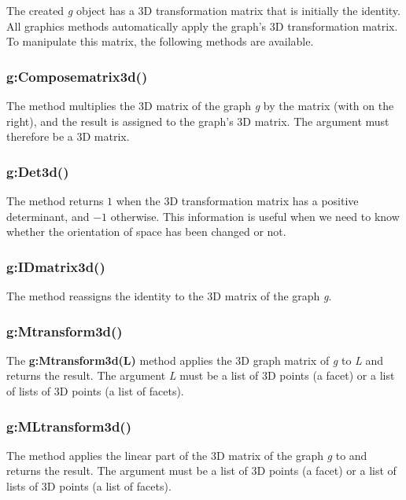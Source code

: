 The created \emph{g} object has a 3D transformation matrix that is initially the identity. All graphics methods automatically apply the graph's 3D transformation matrix. To manipulate this matrix, the following methods are available.

\subsubsection{g:Composematrix3d()}

The  method multiplies the 3D matrix of the graph \emph g by the matrix  (with  on the right), and the result is assigned to the graph's 3D matrix. The argument  must therefore be a 3D matrix.

\subsubsection{g:Det3d()}

The  method returns $1$ when the 3D transformation matrix has a positive determinant, and $-1$ otherwise. This information is useful when we need to know whether the orientation of space has been changed or not.

\subsubsection{g:IDmatrix3d()}

The  method reassigns the identity to the 3D matrix of the graph \emph g.

\subsubsection{g:Mtransform3d()}

The \textbf{g:Mtransform3d(L)} method applies the 3D graph matrix of \emph g to \emph{L} and returns the result. The argument \emph L must be a list of 3D points (a facet) or a list of lists of 3D points (a list of facets).

\subsubsection{g:MLtransform3d()}

The  method applies the linear part of the 3D matrix of the graph \emph g to  and returns the result. The argument  must be a list of 3D points (a facet) or a list of lists of 3D points (a list of facets).

